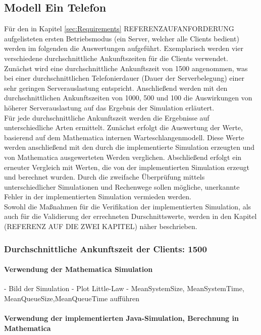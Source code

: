 \subsection{Modell \glqq Ein Telefon\grqq} 
Für den in Kapitel \ref{sec:Requirements} REFERENZAUFANFORDERUNG aufgelisteten ersten Betriebsmodus (ein Server, welcher alle Clients bedient) werden im folgenden die Auswertungen aufgeführt. Exemplarisch werden vier verschiedene durchschnittliche Ankunftszeiten für die Clients verwendet. Zunächst wird eine durchschnittliche Ankunftszeit von 1500 angenommen, was bei einer durchschnittlichen Telefonierdauer (Dauer der Serverbelegung) einer sehr geringen Serverauslastung entspricht. Anschließend werden mit den durchschnittlichen Ankunftszeiten von 1000, 500 und 100 die Auswirkungen von höherer Serverauslastung auf das Ergebnis der Simulation erläutert. \\
Für jede durchschnittliche Ankunftszeit werden die Ergebnisse auf unterschiedliche Arten ermittelt. Zunächst erfolgt die Auswertung der Werte, basierend auf dem Mathematica internen Warteschlangenmodell. Diese Werte werden anschließend mit den durch die implementierte Simulation erzeugten und von Mathematica ausgewerteten Werden verglichen. Abschließend erfolgt ein erneuter Vergleich mit Werten, die von der implementierten Simulation erzeugt und berechnet wurden. Durch die zweifache Überprüfung mittels unterschiedlicher Simulationen und Rechenwege sollen mögliche, unerkannte Fehler in der implementierten Simulation vermieden werden. \\
Sowohl die Maßnahmen für die Verifikation der implementierten Simulation, als auch für die Validierung der errechneten Durschnittswerte, werden in den Kapitel (REFERENZ AUF DIE ZWEI KAPITEL) näher beschrieben.
\subsubsection{Durchschnittliche Ankunftszeit der Clients: 1500}
\paragraph{Verwendung der Mathematica Simulation}
- Bild der Simulation 
- Plot Little-Law
- MeanSystemSize, MeanSystemTime, MeanQueueSize,MeanQueueTime aufführen

\paragraph{Verwendung der implementierten Java-Simulation, Berechnung in Mathematica}

